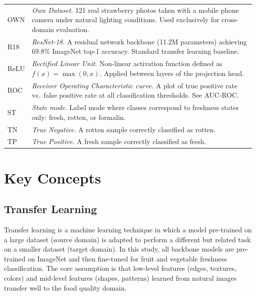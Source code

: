 \documentclass[12pt, a4paper]{article}
\begin{document}
\begin{table}[h]
\begin{tabular}{L{2.5cm} L{11cm}}
OWN     & \textit{Own Dataset.} 121 real strawberry photos taken with a
          mobile phone camera under natural lighting conditions.
          Used exclusively for cross-domain evaluation. \\[4pt]

R18     & \textit{ResNet-18.}
          A residual network backbone (11.2M parameters) achieving
          69.8\% ImageNet top-1 accuracy. Standard transfer learning baseline. \\[4pt]

ReLU    & \textit{Rectified Linear Unit.}
          Non-linear activation function defined as $f(x) = \max(0, x)$.
          Applied between layers of the projection head. \\[4pt]

ROC     & \textit{Receiver Operating Characteristic curve.}
          A plot of true positive rate vs.\ false positive rate at all
          classification thresholds. See AUC-ROC. \\[4pt]

ST      & \textit{State mode.}
          Label mode where classes correspond to freshness states only:
          fresh, rotten, or formalin. \\[4pt]

TN      & \textit{True Negative.}
          A rotten sample correctly classified as rotten. \\[4pt]

TP      & \textit{True Positive.}
          A fresh sample correctly classified as fresh. \\[4pt]

\bottomrule
\end{tabular}
\end{table}

\section{Key Concepts}

\subsection{Transfer Learning}

Transfer learning is a machine learning technique in which a model
pre-trained on a large dataset (source domain) is adapted to perform
a different but related task on a smaller dataset (target domain).
In this study, all backbone models are pre-trained on ImageNet and
then fine-tuned for fruit and vegetable freshness classification.
The core assumption is that low-level features (edges, textures, colors)
and mid-level features (shapes, patterns) learned from natural images
transfer well to the food quality domain.
\end{document}

